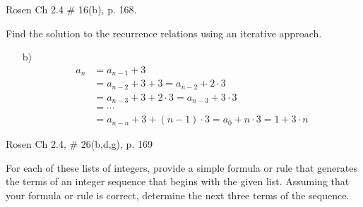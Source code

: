 \documentclass[11pt]{exam}
\begin{document}
\begin{questions}
\question Rosen Ch 2.4 \# 16(b), p. 168.
\begin{solution}
Find the solution to the recurrence relations using an iterative approach.
\begin{itemize}
  \setlength{\itemsep}{1pt}
  \setlength{\parskip}{0pt}
  \setlength{\parsep}{0pt}
    \item[b)]
    \begin{align*}
        a_n &= a_{n-1} + 3 \\
         &= a_{n-2} + 3 + 3 = a_{n-2} + 2\cdot 3 \\
         &= a_{n-3} + 3 + 2\cdot 3 = a_{n-3} + 3\cdot 3 \\
         &= \cdots \\
         &= a_{n-n} + 3 + (n-1)\cdot 3 = a_{0} + n\cdot 3 = 1 + 3\cdot n
    \end{align*}
\end{itemize}
\end{solution}


\question Rosen Ch 2.4, \# 26(b,d,g), p. 169
\begin{solution}
For each of these lists of integers, provide a simple formula or rule that generates the terms of an integer sequence that begins with the given list.  Assuming that your formula or rule is correct, determine the next three terms of the sequence. \\
\begin{parts}

\end{parts}
\end{solution}
\end{questions}
\end{document}
